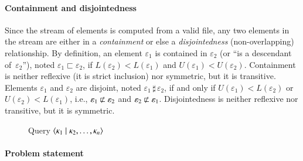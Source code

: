 \paragraph{Containment and disjointedness}

\hspace*{-2pt} Since the stream of elements is computed from a valid
\XML file, any two elements in the stream are either in a
\emph{containment} or else a \emph{disjointedness}
(non\hyp{}overlapping) relationship. By definition, an element
\(\varepsilon_1\) is contained in \(\varepsilon_2\) (or ``is a
descendant of~\(\varepsilon_2\)''), noted \(\varepsilon_1 \sqsubset
\varepsilon_2\), if \(L(\varepsilon_2) < L(\varepsilon_1)\) and
\(U(\varepsilon_1) < U(\varepsilon_2)\). Containment is neither
reflexive (it is strict inclusion) nor symmetric, but it is
transitive. Elements \(\varepsilon_1\) and \(\varepsilon_2\) are
disjoint, noted \(\varepsilon_1 \, \sharp \, \varepsilon_2\), if and
only if \(U(\varepsilon_1) < L(\varepsilon_2)\) or \(U(\varepsilon_2)
< L(\varepsilon_1)\), i.e., \(\varepsilon_1 \nsqsubset \varepsilon_2\)
and \(\varepsilon_2 \nsqsubset \varepsilon_1\). Disjointedness is
neither reflexive nor transitive, but it is symmetric.


\begin{wrapfigure}[7]{r}{0pt}
\caption{Query \(\langle \kappa_1 \mid \kappa_2, \dots, \kappa_n\rangle\)}
\label{fig:pattern}
\end{wrapfigure}

\paragraph{Problem statement}


